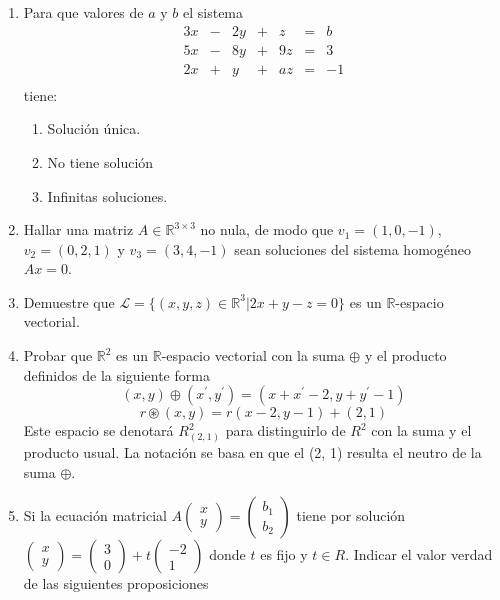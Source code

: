 \documentclass{article}
\begin{document}
\begin{enumerate}
\item Para que valores de $a$ y $b$ el sistema 
\[
\begin{array}{ccccccc}
 3x & - & 2y & + &  z & = &  b  \\
 5x & - & 8y & + & 9z & = &  3  \\
 2x & + &  y & + & az & = & -1  \\
\end{array}
\]
tiene:
\begin{enumerate}
    \item Solución única.
    \item  No tiene solución
    \item Infinitas soluciones.
\end{enumerate}
\item Hallar una matriz $A\in \mathbb{R}^{3\times 3}$ no nula, de modo que $v_1 = (1, 0, -1)$, $v_2 = (0, 2, 1)$ y $v_3 = (3, 4, -1)$ sean soluciones del sistema homogéneo $Ax = 0$.
\item Demuestre que $\mathcal{L} = \{(x, y, z) \in  \mathbb{R}^3 | 2x + y - z = 0\}$ es un $\mathbb{R}$-espacio vectorial.
\item Probar que $\mathbb{R}^2$ es un $\mathbb{R}$-espacio vectorial con la suma $\oplus$ y el producto
definidos de la siguiente forma
\[ (x, y)\oplus
 (x^\prime , y^\prime ) = (x + x^\prime - 2, 
 y + y^\prime - 1) \]
 \[ r \circledast(x, y) = r(x - 2, y - 1) + (2, 1)\]
Este espacio se denotará $R^2_{(2,1)}$ para distinguirlo de $R^2$ con la suma y el producto usual. La notación se basa en que el (2, 1) resulta el neutro de la suma $\oplus$.
 \item Si la ecuación matricial
 $ A \begin{pmatrix}
 x \\ y
 \end{pmatrix}=\begin{pmatrix}
 b_1 \\ b_2 \end{pmatrix}
 $ tiene por solución $\begin{pmatrix}
 x \\ y
 \end{pmatrix}= \begin{pmatrix}
 3 \\ 0
 \end{pmatrix}+t\begin{pmatrix}
 -2 \\ 1
 \end{pmatrix}$
 donde $t$ es fijo y $t\in R$. Indicar el valor verdad de las siguientes proposiciones

\end{enumerate}
\end{document}
